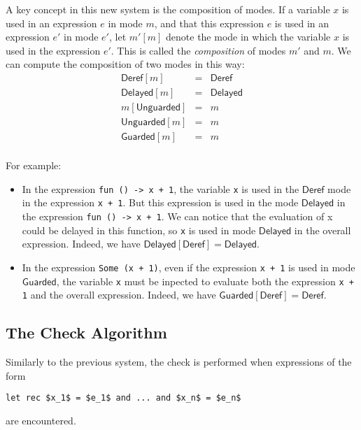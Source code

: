 \documentclass{article}
\newcommand{\Deref}{\mathsf{Deref}}
\newcommand{\Unguarded}{\mathsf{Unguarded}}
\newcommand{\Guarded}{\mathsf{Guarded}}
\newcommand{\Delayed}{\mathsf{Delayed}}
\begin{document}
A key concept in this new system is the composition of modes. If a variable $x$
is used in an expression $e$ in mode $m$, and that this expression $e$ is used
in an expression $e'$ in mode $e'$, let $m'[m]$ denote the mode in which the
variable $x$ is used in the expression $e'$. This is called the
\textit{composition} of modes $m'$ and $m$.  We can compute the composition of two modes in this way: \begin{displaymath} \begin{array}{lll} \Deref [m]     & = & \Deref   \\
    \Delayed [m]   & = & \Delayed \\
    m[\Unguarded]  & = & m        \\
    \Unguarded [m] & = & m        \\
    \Guarded [m]   & = & m        \\
  \end{array}
\end{displaymath}


For example:
\begin{itemize}
  \item In the expression \lstinline|fun () -> x + 1|, the variable
    \lstinline|x| is used in the $\Deref$ mode in the expression
    \lstinline|x + 1|. But this expression is used in the mode $\Delayed$ in the
    expression \lstinline|fun () -> x + 1|. We can notice that the evaluation of
    x could be delayed in this function, so \lstinline|x| is used in mode
    $\Delayed$ in the overall expression. Indeed, we have
    $\Delayed [\Deref] = \Delayed$.

  \item In the expression \lstinline|Some (x + 1)|, even if the expression
    \lstinline|x + 1| is used in mode $\Guarded$, the variable \lstinline|x|
    must be inpected to evaluate both the expression \lstinline|x + 1| and the
    overall expression. Indeed, we have $\Guarded [\Deref] = \Deref$.
\end{itemize}

\subsection{The Check Algorithm}

Similarly to the previous system, the check is performed when expressions of the
form
\begin{lstlisting}[mathescape=true]
  let rec $x_1$ = $e_1$ and ... and $x_n$ = $e_n$
\end{lstlisting}
are encountered.
\end{document}
